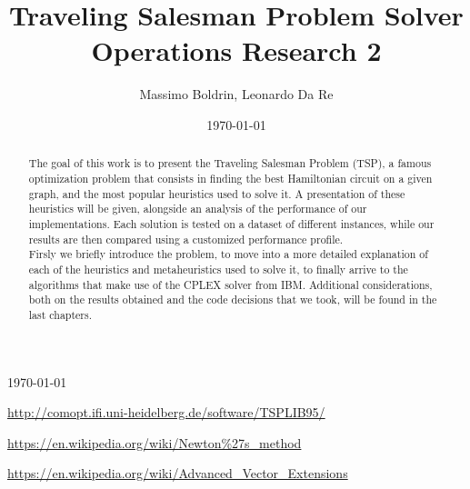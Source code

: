 \documentclass[a4paper]{report}
\begin{document}
\begin{titlepage}
	
	\vfill\vfill\vfill %
	
	{\large\today} %
	
	
	 
	
	\vfill %
	
\end{titlepage}


\title{Traveling Salesman Problem Solver \\ Operations Research 2} %

\author{Massimo Boldrin, Leonardo Da Re}

\date{\today}

\begin{abstract}
	The goal of this work is to present the Traveling Salesman Problem (TSP), a famous optimization
	problem that consists in finding the best Hamiltonian circuit on a given graph, and
	the most popular heuristics used to solve it. A presentation of these heuristics will be given, alongside an analysis of
	the performance of our implementations. Each solution is tested on a dataset of different instances, while our results are then
	compared using a customized performance profile.\\
	Firsly we briefly introduce the problem, to move into a more detailed explanation of each of the heuristics and metaheuristics used
	to solve it, to finally arrive to the algorithms that make use of the CPLEX solver from IBM.
	Additional considerations, both on the results obtained and the code decisions that we took, will be found in the last chapters.
\end{abstract}

\tableofcontents



















\begin{thebibliography}{9}
	\url{http://comopt.ifi.uni-heidelberg.de/software/TSPLIB95/}

	\url{https://en.wikipedia.org/wiki/Newton%27s_method}

	\url{https://en.wikipedia.org/wiki/Advanced_Vector_Extensions}

\end{thebibliography}
\end{document}
